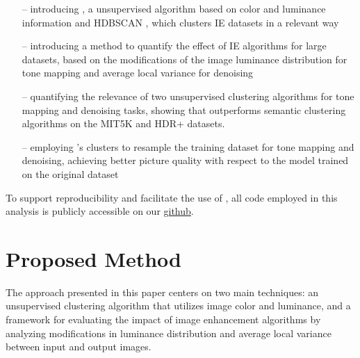 \documentclass[12pt]{spieman}  %
\begin{document}
\begin{spacing}{2}
\begin{linenumbers}
\begin{itemize}
\item[--] introducing \clustname, a unsupervised algorithm based on color and luminance information and HDBSCAN \cite{CampelloHDBSCAN}, which clusters IE datasets in a relevant way
\item[--] introducing a  method to quantify the effect of IE algorithms for large datasets, based on the modifications of the image luminance distribution for tone mapping and average local variance for denoising 
\item[--] quantifying the relevance of two unsupervised clustering algorithms for tone mapping and denoising tasks, showing that \clustname  outperforms semantic clustering algorithms on the MIT5K and HDR+ datasets.
\item[--] employing \clustname's clusters to resample the training dataset for tone mapping and denoising, achieving better picture quality with respect to the model trained on the original dataset

\end{itemize}	



To support reproducibility and facilitate the use of \clustname, all code employed in this analysis is publicly accessible on our \href{https://github.com/GiuliaBonino/CARDIE}{ github}.  




\section{Proposed Method}
\label{section:method}


The approach presented in this paper centers on two main techniques: an unsupervised clustering algorithm that utilizes image color and luminance, and a framework for evaluating the impact of image enhancement algorithms by analyzing modifications in luminance distribution and average local variance between input and output images. 




\end{linenumbers}
\end{spacing}
\end{document}
